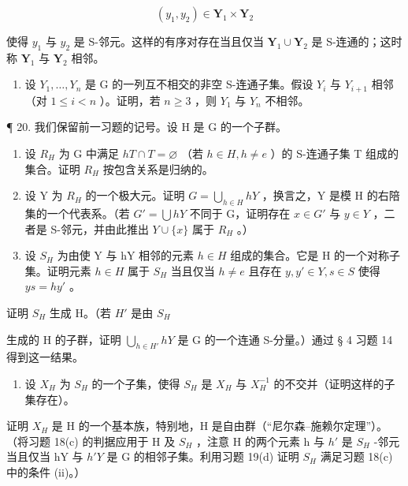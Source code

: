 \[
\left(y _ {1}, y _ {2}\right) \in \mathbf {Y} _ {1} \times \mathbf {Y} _ {2}
\]

使得 \(y_{1}\) 与 \(y_{2}\) 是 S-邻元。这样的有序对存在当且仅当 \(\mathbf{Y}_1 \cup \mathbf{Y}_2\) 是 S-连通的；这时称 \(\mathbf{Y}_1\) 与 \(\mathbf{Y}_2\) 相邻。

\begin{enumerate}
\def\labelenumi{(\alph{enumi})}
\setcounter{enumi}{3}
\tightlist
\item
  设 \(Y_{1}, \ldots, Y_{n}\) 是 G 的一列互不相交的非空 S-连通子集。假设 \(Y_{i}\) 与 \(Y_{i+1}\) 相邻（对 \(1 \leqslant i < n\) ）。证明，若 \(n \geqslant 3\) ，则 \(Y_{1}\) 与 \(Y_{n}\) 不相邻。
\end{enumerate}

¶ 20. 我们保留前一习题的记号。设 H 是 G 的一个子群。

\begin{enumerate}
\def\labelenumi{(\alph{enumi})}
\item
  设 \(R_{H}\) 为 G 中满足 \(hT \cap T = \varnothing\) （若 \(h \in H, h \neq e\) ）的 S-连通子集 T 组成的集合。证明 \(R_{H}\) 按包含关系是归纳的。
\item
  设 Y 为 \(R_{H}\) 的一个极大元。证明 \(G = \bigcup_{h \in H} hY\) ，换言之，Y 是模 H 的右陪集的一个代表系。（若 \(G' = \bigcup hY\) 不同于 G，证明存在 \(x \in G'\) 与 \(y \in Y\) ，二者是 S-邻元，并由此推出 \(Y \cup \{x\}\) 属于 \(R_{H}\) 。）
\item
  设 \(S_{H}\) 为由使 Y 与 hY 相邻的元素 \(h \in H\) 组成的集合。它是 H 的一个对称子集。证明元素 \(h \in H\) 属于 \(S_{H}\) 当且仅当 \(h \neq e\) 且存在 \(y, y' \in Y, s \in S\) 使得 \(ys = hy'\) 。
\end{enumerate}

证明 \(S_{H}\) 生成 H。（若 \(H'\) 是由 \(S_{H}\)

生成的 H 的子群，证明 \(\bigcup_{h\in H'}hY\) 是 G 的一个连通 S-分量。）通过 § 4 习题 14 得到这一结果。

\begin{enumerate}
\def\labelenumi{(\alph{enumi})}
\setcounter{enumi}{3}
\tightlist
\item
  设 \(X_{H}\) 为 \(S_{H}\) 的一个子集，使得 \(S_{H}\) 是 \(X_{H}\) 与 \(X_{H}^{-1}\) 的不交并（证明这样的子集存在）。
\end{enumerate}

证明 \(X_{H}\) 是 H 的一个基本族，特别地，H 是自由群（“尼尔森–施赖尔定理”）。（将习题 18(c) 的判据应用于 H 及 \(S_{H}\) ，注意 H 的两个元素 h 与 \(h'\) 是 \(S_{H}\) -邻元当且仅当 hY 与 \(h'Y\) 是 G 的相邻子集。利用习题 19(d) 证明 \(S_{H}\) 满足习题 18(c) 中的条件 (ii)。）

